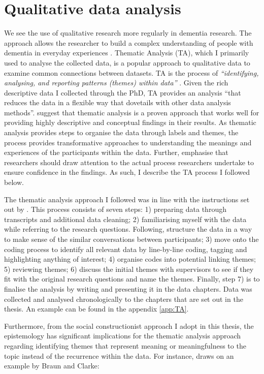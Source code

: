 \section{Qualitative data analysis}
\label{QualDataAnalysis}
We see the use of qualitative research more regularly in dementia research. The approach allows the researcher to build a complex understanding of people with dementia in everyday experiences \citep{mckeown_actively_2009}. Thematic Analysis (TA), which I primarily used to analyse the collected data, is a popular approach to qualitative data to examine common connections between datasets. TA is the process of \textit{``identifying, analysing, and reporting patterns (themes) within data''} \citep{braun_using_2006}. Given the rich descriptive data I collected through the PhD, TA provides an analysis ``that reduces the data in a flexible way that dovetails with other data analysis methods''. \citep{kiger2020thematic} suggest that thematic analysis is a proven approach that works well for providing highly descriptive and conceptual findings in their results. As thematic analysis provides steps to organise the data through labels and themes, the process provides transformative approaches to understanding the meanings and experiences of the participants within the data. Further, \cite{braun2012thematic} emphasise that researchers should draw attention to the actual process researchers undertake to ensure confidence in the findings. As such, I describe the TA process I followed below.

The thematic analysis approach I followed was in line with the instructions set out by \cite{braun_one_2020}. This process consists of seven steps: 1) preparing data through transcripts and additional data cleaning; 2) familiarising myself with the data while referring to the research questions. Following, structure the data in a way to make sense of the similar conversations between participants; 3) move onto the coding process to identify all relevant data by line-by-line coding, tagging and highlighting anything of interest; 4) organise codes into potential linking themes; 5) reviewing themes; 6) discuss the initial themes with supervisors to see if they fit with the original research questions and name the themes. Finally, step 7) is to finalise the analysis by writing and presenting it in the data chapters. Data was collected and analysed chronologically to the chapters that are set out in the thesis. An example can be found in the appendix \ref{app:TA}.

Furthermore, from the social constructionist approach I adopt in this thesis, the epistemology has significant implications for the thematic analysis approach regarding identifying themes that represent meaning or meaningfulness to the topic instead of the recurrence within the data. For instance, \cite{byrne2021worked} draws on an example by Braun and Clarke: 

